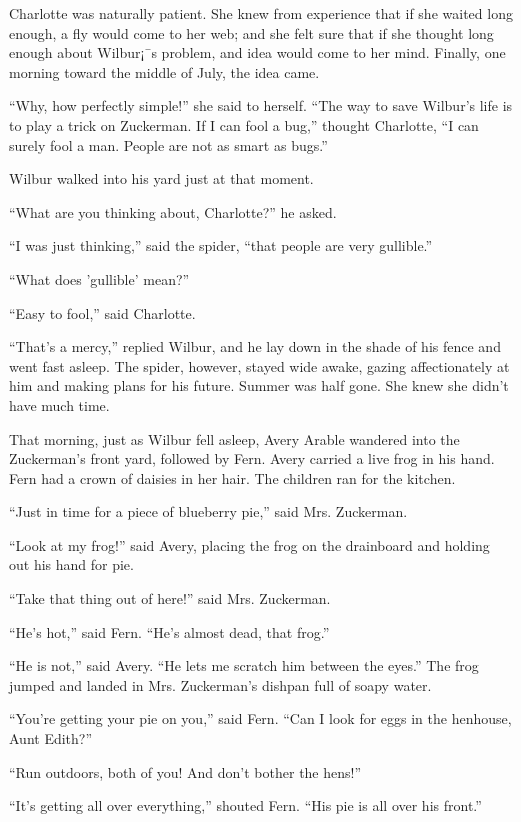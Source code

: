 \documentclass[a4paper, oneside]{book}
\begin{document}
Charlotte was naturally patient. She knew from experience
that if she waited long enough, a fly would come to her web; and
she felt sure that if she thought long enough about Wilbur¡¯s
problem, and idea would come to her mind.
 Finally, one morning toward the middle of July, the idea came.

``Why, how perfectly simple!'' she said to herself. ``The way to save
Wilbur's life is to play a trick on Zuckerman. If I can fool a bug,''
thought Charlotte, ``I can surely fool a man. People are not as smart
as bugs.''

Wilbur walked into his yard just at that moment.

``What are you thinking about, Charlotte?'' he asked.

``I was just thinking,'' said the spider, ``that people are very
gullible.''

``What does 'gullible' mean?''

``Easy to fool,'' said Charlotte.

``That's a mercy,'' replied Wilbur, and he lay down in the shade
of his fence and went fast asleep. The spider, however, stayed wide
awake, gazing affectionately at him and making plans for his future. 
Summer was half gone. She knew she didn't have much time.

 That morning, just as Wilbur fell asleep, Avery Arable
wandered into the Zuckerman's front yard, followed by Fern. Avery
carried a live frog in his hand. Fern had a crown of daisies in her
hair. The children ran for the kitchen. 

``Just in time for a piece of blueberry pie,'' said Mrs.
Zuckerman.

``Look at my frog!'' said Avery, placing the frog on the
drainboard and holding out his hand for pie.

``Take that thing out of here!'' said Mrs. Zuckerman.

``He's hot,'' said Fern. ``He's almost dead, that frog.'' 

``He is not,'' said Avery. ``He lets me scratch him between the
eyes.'' The frog jumped and landed in Mrs. Zuckerman's dishpan
full of soapy water.

``You're getting your pie on you,'' said Fern. ``Can I look for
eggs in the henhouse, Aunt Edith?''

``Run outdoors, both of you! And don't bother the hens!''

``It's getting all over everything,'' shouted Fern. ``His pie is all
over his front.''
\end{document}
